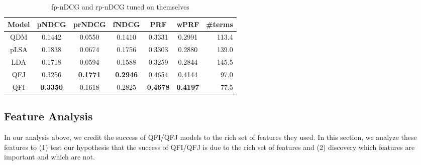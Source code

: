 \begin{table}[h!]
\centering
\caption{fp-nDCG and rp-nDCG tuned on themselves}
\label{tab:intrinsic-rank}
\begin{tabular}{|c|c|c|c|c|c|r|} \hline
Model & pNDCG & prNDCG & fNDCG & PRF & wPRF & \#terms \\ \hline
QDM & 0.1442 & 0.0550 & 0.1410 & 0.3331 & 0.2991 & 113.4 \\ \hline
pLSA & 0.1838 & 0.0674 & 0.1756 & 0.3303 & 0.2880 & 139.0 \\ \hline
LDA & 0.1718 & 0.0594 & 0.1588 & 0.3259 & 0.2844 & 145.5 \\ \hline
QFJ & 0.3256 & \textbf{0.1771} & \textbf{0.2946} & 0.4654 & 0.4144 & 97.0 \\ \hline
QFI & \textbf{0.3350} & 0.1618 & 0.2825 & \textbf{0.4678} & \textbf{0.4197} & 77.5 \\ \hline
\end{tabular}
\end{table}

\subsection{Feature Analysis}
In our analysis above, we credit the success of QFI/QFJ models to the rich set of features they used. In this section, we analyze these features to (1) test our hypothesis that the success of QFI/QFJ is due to the rich set of features and (2) discovery which features are important and which are not.

